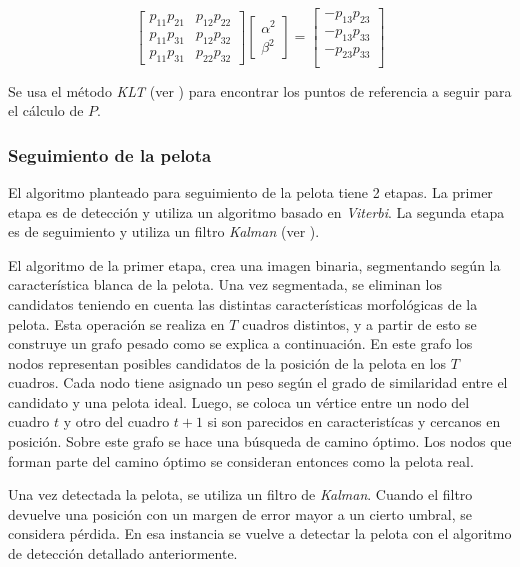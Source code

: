 \documentclass[a4paper,10pt]{article}
\begin{document}
\begin{equation}
\begin{bmatrix}
    p_{1 1} p_{2 1} & p_{1 2} p_{2 2} \\
    p_{1 1} p_{3 1} & p_{1 2} p_{3 2} \\
    p_{1 1} p_{3 1} & p_{2 2} p_{3 2}
\end{bmatrix}
\begin{bmatrix}
    \alpha^2 \\
    \beta^2
\end{bmatrix}
 =
\begin{bmatrix}
    - p_{1 3} p_{2 3} \\
    - p_{1 3} p_{3 3} \\
    - p_{2 3} p_{3 3} \\
\end{bmatrix}
\end{equation}

Se usa el método \textit{KLT} (ver \cite{KLT}) para encontrar los puntos de referencia a seguir para el cálculo de $P$.

\subsubsection*{Seguimiento de la pelota}

El algoritmo planteado para seguimiento de la pelota tiene 2 etapas.
La primer etapa es de detección y utiliza un algoritmo basado en \textit{Viterbi}.
La segunda etapa es de seguimiento y utiliza un filtro \textit{Kalman} (ver \cite{funk2003study}).

El algoritmo de la primer etapa, crea una imagen binaria, segmentando según la característica blanca de la pelota.
Una vez segmentada, se eliminan los candidatos teniendo en cuenta las distintas características morfológicas de la pelota.
Esta operación se realiza en $T$ cuadros distintos, y a partir de esto se construye un grafo pesado como se explica a continuación.
En este grafo los nodos representan posibles candidatos de la posición de la pelota en los $T$ cuadros.
Cada nodo tiene asignado un peso según el grado de similaridad entre el candidato y una pelota ideal.
Luego, se coloca un vértice entre un nodo del cuadro $t$ y otro del cuadro $t + 1$ si son parecidos en caracteristícas y cercanos en posición.
Sobre este grafo se hace una búsqueda de camino óptimo. Los nodos que forman parte del camino óptimo se consideran entonces
como la pelota real.

Una vez detectada la pelota, se utiliza un filtro de \textit{Kalman}.
Cuando el filtro devuelve una posición con un margen de error mayor a un cierto umbral, se considera pérdida.
En esa instancia se vuelve a detectar la pelota con el algoritmo de detección detallado anteriormente.
\end{document}
